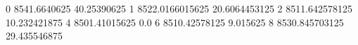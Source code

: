 0 8541.6640625 40.25390625
1 8522.0166015625 20.6064453125
2 8511.642578125 10.232421875
4 8501.41015625 0.0
6 8510.42578125 9.015625
8 8530.845703125 29.435546875

